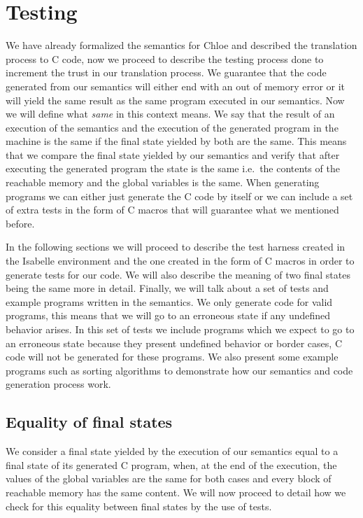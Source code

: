 \chapter{Testing}\label{chapter:testing}

We have already formalized the semantics for Chloe and described the translation process to C code, now we proceed to describe the testing process done to increment the trust in our translation process.
We guarantee that the code generated from our semantics will either end with an out of memory error or it will yield the same result as the same program executed in our semantics.
Now we will define what \textit{same} in this context means.
We say that the result of an execution of the semantics and the execution of the generated program in the machine is the same if the final state yielded by both are the same.
This means that we compare the final state yielded by our semantics and verify that after executing the generated program the state is the same i.e.\ the contents of the reachable memory and the global variables is the same.
When generating programs we can either just generate the C code by itself or we can include a set of extra tests in the form of C macros that will guarantee what we mentioned before.

In the following sections we will proceed to describe the test harness created in the Isabelle environment and the one created in the form of C macros in order to generate tests for our code.
We will also describe the meaning of two final states being the same more in detail.
Finally, we will talk about a set of tests and example programs written in the semantics.
We only generate code for valid programs, this means that we will go to an erroneous state if any undefined behavior arises.
In this set of tests we include programs which we expect to go to an erroneous state because they present undefined behavior or border cases, C code will not be generated for these programs.
We also present some example programs such as sorting algorithms to demonstrate how our semantics and code generation process work.


\section{Equality of final states}

We consider a final state yielded by the execution of our semantics equal to a final state of its generated C program, when, at the end of the execution, the values of the global variables are the same for both cases and every block of reachable memory has the same content.
We will now proceed to detail how we check for this equality between final states by the use of tests.

